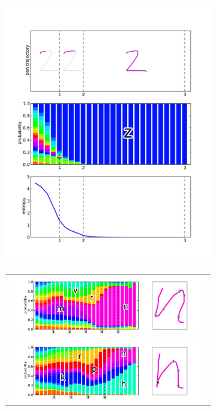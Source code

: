 \documentclass{sigchi}
\begin{document}
\begin{figure}[!p]
  \centering
  \begin{subfigure}[b]{0.35\textwidth}
    \includegraphics[width=\textwidth]{figures/entropy_z.pdf}
    \caption{}
    \label{fig:entropy_z}
  \end{subfigure}
  \begin{subfigure}[b]{0.45\textwidth}
    \begin{tabular}{c}
      \includegraphics[width=\textwidth]{figures/best_l1.pdf}\\
      \includegraphics[width=\textwidth]{figures/unclear_l1.pdf}\\

\end{tabular}
\end{subfigure}
\end{figure}
\end{document}
